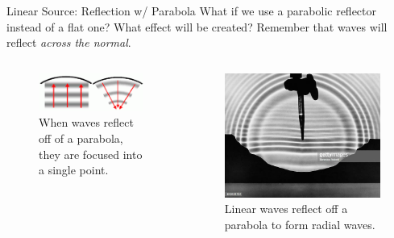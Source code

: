 \documentclass{beamer}
\begin{document}
\begin{frame}{Linear Source: Reflection w/ Parabola}
    What if we use a parabolic reflector instead of a flat one? What effect will be created? Remember that waves will reflect \textit{across the normal}.
    \begin{columns}[T]
        \begin{column}{.45\textwidth}
            \begin{figure}
                \centering
                \includegraphics[scale=.45]{parabolaref.png}
                \caption{When waves reflect off of a parabola, they are focused into a single point.}
                \label{fig:parabolatheory}
            \end{figure}
        \end{column}
         \begin{column}{.45\textwidth}
           \begin{figure}
               \centering
               \includegraphics[scale=.7]{parabolaref2.jpg}
               \caption{Linear waves reflect off a parabola to form radial waves.}
               \label{fig:parabolatank}
           \end{figure}
         \end{column}
    \end{columns}
\end{frame}
\end{document}
